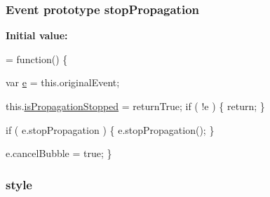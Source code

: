 \subsubsection[{stop\+Propagation}]{ {\bf Event} {\bf prototype} stop\+Propagation}\label{jquery-1_810_82-vsdoc_8js_ad7254bed2a2157174df61645464ed6b7}
{\bfseries Initial value\+:}
\begin{DoxyCode}
= \textcolor{keyword}{function}() \{


        var \hyperlink{_bibabook_2_scripts_2jquery-1_810_82_8min_8js_a2c038346d47955cbe2cb91e338edd7e1}{e} = this.originalEvent;

        this.\hyperlink{jquery-1_810_82-vsdoc_8js_a67f2430529d27bb55dbfa279dc2899ea}{isPropagationStopped} = returnTrue;
        \textcolor{keywordflow}{if} ( !e ) \{
            \textcolor{keywordflow}{return};
        \}
        
        \textcolor{keywordflow}{if} ( e.stopPropagation ) \{
            e.stopPropagation();
        \}

        
        
        e.cancelBubble = \textcolor{keyword}{true};
    \}
\end{DoxyCode}
\hypertarget{jquery-1_810_82-vsdoc_8js_af3f76f18e38dd06c0a345ede43abb420}{}
\subsubsection[{style}]{ style}\label{jquery-1_810_82-vsdoc_8js_af3f76f18e38dd06c0a345ede43abb420}
\hypertarget{jquery-1_810_82-vsdoc_8js_a58af54f4f7137a051db7e3e27bdfe1b5}{}
